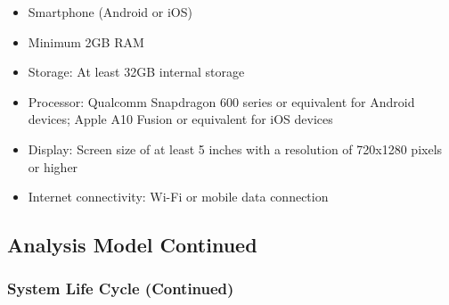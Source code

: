 \begin{itemize}
\item Smartphone (Android or iOS)
\item Minimum 2GB RAM
\item Storage: At least 32GB internal storage
\item Processor: Qualcomm Snapdragon 600 series or equivalent for Android devices; Apple A10 Fusion or equivalent for iOS devices
\item Display: Screen size of at least 5 inches with a resolution of 720x1280 pixels or higher
\item Internet connectivity: Wi-Fi or mobile data connection
\end{itemize}
\newpage


\subsection{Analysis Model Continued}



\subsubsection{System Life Cycle (Continued)}




\newpage
